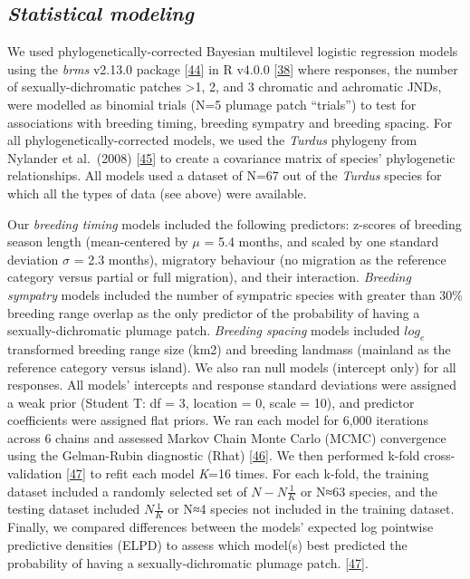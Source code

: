 \documentclass[
  a4paper,
]{article}
\begin{document}
\hypertarget{statistical-modeling}{%
\subsection{\texorpdfstring{\emph{Statistical
modeling}}{Statistical modeling}}\label{statistical-modeling}}

We used phylogenetically-corrected Bayesian multilevel logistic
regression models using the \emph{brms} v2.13.0 package
{[}\protect\hyperlink{ref-burkner2017}{44}{]} in R v4.0.0
{[}\protect\hyperlink{ref-rcoreteam2020}{38}{]}⁠ where responses, the
number of sexually-dichromatic patches \textgreater1, 2, and 3 chromatic
and achromatic JNDs, were modelled as binomial trials (N=5 plumage patch
``trials'') to test for associations with breeding timing, breeding
sympatry and breeding spacing. For all phylogenetically-corrected
models, we used the \emph{Turdus} phylogeny from Nylander et al.~(2008)
{[}\protect\hyperlink{ref-nylander2008}{45}{]} to create a covariance
matrix of species' phylogenetic relationships. All models used a dataset
of N=67 out of the \emph{Turdus} species for which all the types of data
(see above) were available.

Our \emph{breeding timing} models included the following predictors:
z-scores of breeding season length (mean-centered by \(\mu\) = 5.4
months, and scaled by one standard deviation \(\sigma\) = 2.3 months),
migratory behaviour (no migration as the reference category versus
partial or full migration), and their interaction. \emph{Breeding
sympatry} models included the number of sympatric species with greater
than 30\% breeding range overlap as the only predictor of the
probability of having a sexually-dichromatic plumage patch.
\emph{Breeding spacing} models included \(log_{e}\) transformed breeding
range size (km2) and breeding landmass (mainland as the reference
category versus island). We also ran null models (intercept only) for
all responses. All models' intercepts and response standard deviations
were assigned a weak prior (Student T: df = 3, location = 0, scale =
10), and predictor coefficients were assigned flat priors. We ran each
model for 6,000 iterations across 6 chains and assessed Markov Chain
Monte Carlo (MCMC) convergence using the Gelman-Rubin diagnostic (Rhat)
{[}\protect\hyperlink{ref-gelman2013}{46}{]}. We then performed k-fold
cross-validation {[}\protect\hyperlink{ref-vehtari2017}{47}{]} to refit
each model \emph{K}=16 times. For each k-fold, the training dataset
included a randomly selected set of \(N- N\frac{1}{K}\) or N≈63 species,
and the testing dataset included \(N\frac{1}{K}\) or N≈4 species not
included in the training dataset. Finally, we compared differences
between the models' expected log pointwise predictive densities (ELPD)
to assess which model(s) best predicted the probability of having a
sexually-dichromatic plumage patch.
{[}\protect\hyperlink{ref-vehtari2017}{47}{]}⁠.
\end{document}
